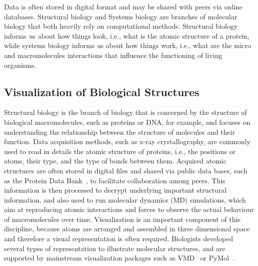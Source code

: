 Data is often stored in digital format and may be shared with peers via online databases.
Structural biology and Systems biology are branches of molecular biology that both heavily rely on computational methods.
Structural biology informs us about how things look, i.e., what is the atomic structure of a protein, while systems biology informs us about how things work, i.e., what are the micro and macromolecules interactions that influence the functioning of living organisms.

\subsection{Visualization of Biological Structures}

Structural biology is the branch of biology that is concerned by the structure of biological macromolecules, such as proteins or DNA, for example, and focuses on understanding the relationship between the structure of molecules and their function.
Data acquisition methods, such as x-ray crystallography, are commonly used to read in details the atomic structure of proteins, i.e., the positions or atoms, their type, and the type of bonds between them.
Acquired atomic structures are often stored in digital files and shared via public data bases, such as the Protein Data Bank~\cite{bernstein1977protein}, to facilitate collaboration among peers.
This information is then processed to decrypt underlying important structural information, and also used to run molecular dynamics (MD) simulations, which aim at reproducing atomic interactions and forces to observe the actual behaviour of macromolecules over time.
Visualization is an important component of this discipline, because atoms are arranged and assembled in three dimensional space and therefore a visual representation is often required.
Biologists developed several types of representation to illustrate molecular structures, and are supported by mainstream visualization packages such as VMD~\cite{humphrey1996vmd} or PyMol~\cite{PyMOL}.


